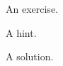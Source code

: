 \begin{exercise}
	An exercise.
\end{exercise}
\begin{hint}
	A hint.
\end{hint}
\begin{solution}
	A solution.
\end{solution}
